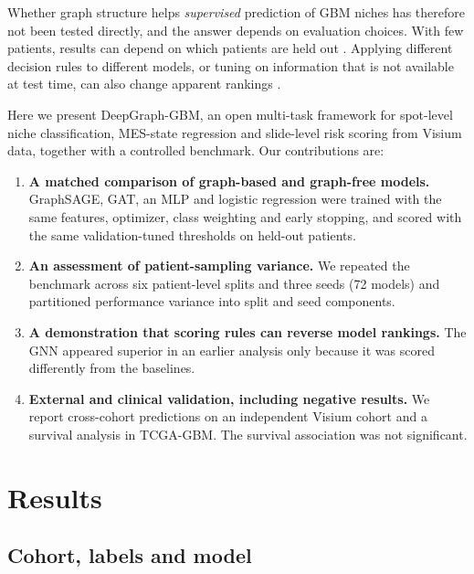 \documentclass[11pt,letterpaper]{article}
\begin{document}
Whether graph structure helps \emph{supervised} prediction of GBM niches has therefore not been tested directly, and the answer depends on evaluation choices. With few patients, results can depend on which patients are held out \cite{bouthillier2021,varoquaux2022}. Applying different decision rules to different models, or tuning on information that is not available at test time, can also change apparent rankings \cite{kapoor2023}.

Here we present DeepGraph-GBM, an open multi-task framework for spot-level niche classification, MES-state regression and slide-level risk scoring from Visium data, together with a controlled benchmark. Our contributions are:
\begin{enumerate}
  \item \textbf{A matched comparison of graph-based and graph-free models.} GraphSAGE, GAT, an MLP and logistic regression were trained with the same features, optimizer, class weighting and early stopping, and scored with the same validation-tuned thresholds on held-out patients.
  \item \textbf{An assessment of patient-sampling variance.} We repeated the benchmark across six patient-level splits and three seeds (72 models) and partitioned performance variance into split and seed components.
  \item \textbf{A demonstration that scoring rules can reverse model rankings.} The GNN appeared superior in an earlier analysis only because it was scored differently from the baselines.
  \item \textbf{External and clinical validation, including negative results.} We report cross-cohort predictions on an independent Visium cohort and a survival analysis in TCGA-GBM. The survival association was not significant.
\end{enumerate}

\section{Results}

\subsection{Cohort, labels and model}
\end{document}
